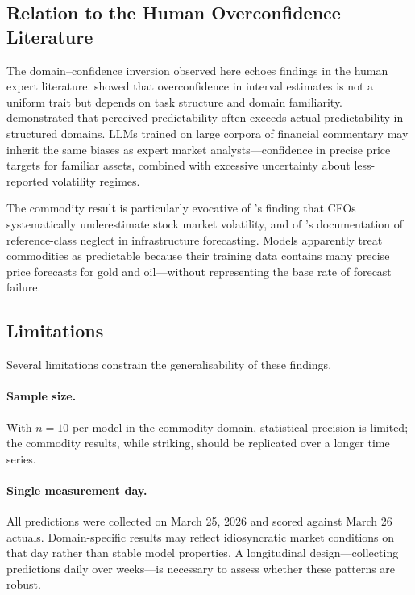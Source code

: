 \documentclass[9pt,twoside,lineno]{pnas-new}
\begin{document}
\subsection*{Relation to the Human Overconfidence Literature}

The domain--confidence inversion observed here echoes findings in the human expert literature. \citet{klayman1999} showed that overconfidence in interval estimates is not a uniform trait but depends on task structure and domain familiarity. \citet{griffin1992} demonstrated that perceived predictability often exceeds actual predictability in structured domains. LLMs trained on large corpora of financial commentary may inherit the same biases as expert market analysts---confidence in precise price targets for familiar assets, combined with excessive uncertainty about less-reported volatility regimes.

The commodity result is particularly evocative of \citet{ben-david2013}'s finding that CFOs systematically underestimate stock market volatility, and of \citet{flyvbjerg2002}'s documentation of reference-class neglect in infrastructure forecasting. Models apparently treat commodities as predictable because their training data contains many precise price forecasts for gold and oil---without representing the base rate of forecast failure.

\subsection*{Limitations}

Several limitations constrain the generalisability of these findings.

\paragraph{Sample size.} With $n = 10$ per model in the commodity domain, statistical precision is limited; the commodity results, while striking, should be replicated over a longer time series.

\paragraph{Single measurement day.} All predictions were collected on March 25, 2026 and scored against March 26 actuals. Domain-specific results may reflect idiosyncratic market conditions on that day rather than stable model properties. A longitudinal design---collecting predictions daily over weeks---is necessary to assess whether these patterns are robust.
\end{document}
